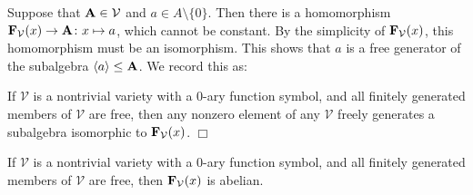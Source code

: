 Suppose that ${{\mathbf{\uppercase{a}}}}\in \mathcal V$ and $a\in A\setminus \{0\}$.
Then there is a homomorphism ${{\mathbf{\uppercase{f}}}}_{\mathcal V}(x)\to {{\mathbf{\uppercase{a}}}}\colon x\mapsto a$,
which cannot be constant. By the
simplicity of ${{\mathbf{\uppercase{f}}}}_{\mathcal V}(x)$, this homomorphism
must be an isomorphism. This shows
that $a$ is a free generator of the subalgebra $\langle a\rangle\leq {{\mathbf{\uppercase{a}}}}$.
We record this as:

    \begin{lm}\label{freely}
    If $\mathcal V$ is a nontrivial variety with
    a $0$-ary function symbol, and
    all finitely generated members of $\mathcal V$ are free, then
    any nonzero element of any $\mathcal V$
    {freely} generates a subalgebra isomorphic to ${{\mathbf{\uppercase{f}}}}_{\mathcal V}(x)$. $\Box$
      \end{lm}

\begin{lm}\label{abelian}
    If $\mathcal V$ is a nontrivial variety with
    a $0$-ary function symbol, and
    all finitely generated members of $\mathcal V$ are free, then
    ${{\mathbf{\uppercase{f}}}}_{\mathcal V}(x)$ is abelian.
  \end{lm}

